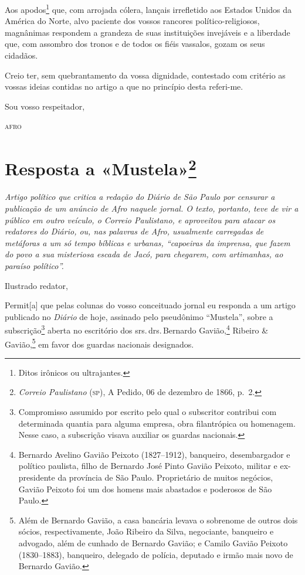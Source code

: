 Aos apodos\footnote{Ditos irônicos ou ultrajantes.} que, com arrojada
cólera, lançais irrefletido aos Estados Unidos da América do Norte, alvo
paciente dos vossos rancores político-religiosos, magnânimas respondem a
grandeza de suas instituições invejáveis e a liberdade que, com assombro
dos tronos e de todos os fiéis vassalos, gozam os seus cidadãos.

Creio ter, sem quebrantamento da vossa dignidade, contestado com
critério as vossas ideias contidas no artigo a que no princípio desta
referi-me.

\begin{flushright}
Sou vosso respeitador,

\textsc{afro}
\end{flushright}

\chapter{Resposta a «Mustela»\footnote{\emph{Correio Paulistano} (\textsc{sp}), A Pedido, 06 de dezembro de 1866, p.~2.}}

\begin{didascalia}\itshape
Artigo político que critica a redação do \textnormal{Diário de São Paulo} por
censurar a publicação de um anúncio de Afro naquele jornal. O texto,
portanto, teve de vir a público em outro veículo, o \textnormal{Correio
Paulistano}, e aproveitou para atacar os redatores do
\textnormal{Diário}, ou, nas palavras de Afro, usualmente carregadas de
metáforas a um só tempo bíblicas e urbanas, ``capoeiras da imprensa, que
fazem do povo a sua misteriosa escada de Jacó, para chegarem, com
artimanhas, ao paraíso político''.
\end{didascalia}



Ilustrado redator,

Permit{[}a{]} que pelas colunas do vosso conceituado jornal eu responda
a um artigo publicado no \emph{Diário} de hoje, assinado pelo pseudônimo
``Mustela'', sobre a subscrição\footnote{Compromisso assumido por
  escrito pelo qual o subscritor contribui com determinada quantia para
  alguma empresa, obra filantrópica ou homenagem. Nesse caso, a
  subscrição visava auxiliar os guardas nacionais.} aberta no escritório
dos srs.\,drs.\,Bernardo Gavião,\footnote{Bernardo Avelino Gavião Peixoto
  (1827--1912), banqueiro, desembargador e político paulista, filho de
  Bernardo José Pinto Gavião Peixoto, militar e ex-presidente da
  província de São Paulo. Proprietário de muitos negócios, Gavião
  Peixoto foi um dos homens mais abastados e poderosos de São Paulo.}
Ribeiro \& Gavião,\footnote{Além de Bernardo Gavião, a casa bancária
  levava o sobrenome de outros dois sócios, respectivamente, João
  Ribeiro da Silva, negociante, banqueiro e advogado, além de cunhado de
  Bernardo Gavião; e Camilo Gavião Peixoto (1830--1883), banqueiro,
  delegado de polícia, deputado e irmão mais novo de Bernardo Gavião.}
em favor dos guardas nacionais designados.

